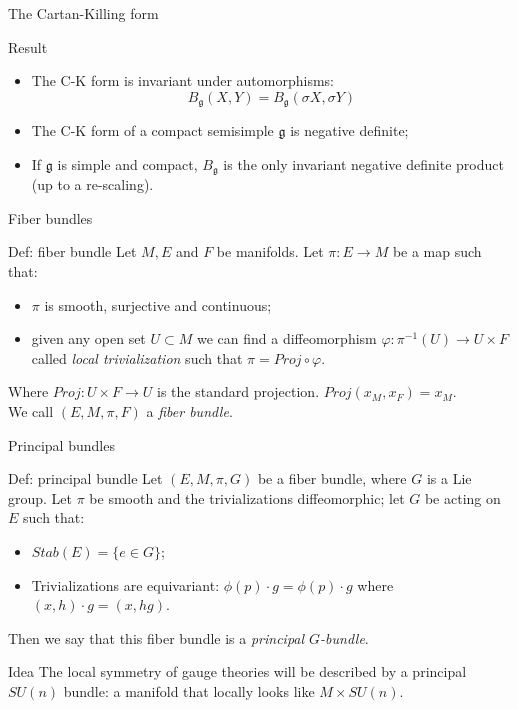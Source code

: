 \documentclass{beamer}
\begin{document}
\begin{frame}{The Cartan-Killing form}
	\begin{block}{Result}
		\begin{itemize}
			\item The C-K form is invariant under automorphisms: $$B_\mathfrak{g}(X,Y)=B_\mathfrak{g}(\sigma X,\sigma Y)$$
			\item The C-K form of a compact semisimple $\mathfrak{g}$ is negative definite;
			\item If $\mathfrak{g}$ is simple and compact, $B_\mathfrak{g}$ is the only invariant negative definite product (up to a re-scaling).
			
		\end{itemize}
	\end{block}
\end{frame}
\begin{frame}{Fiber bundles}
	\begin{exampleblock}{Def: fiber bundle}
		Let $M, E$ and $F$ be manifolds. Let $\pi: E\rightarrow M$ be a map such that:
		\begin{itemize}
			\item $\pi$ is smooth, surjective and continuous;
			\item given any open set $U\subset M$ we can find a diffeomorphism $\varphi: \pi^{-1}(U)\rightarrow U\times F$ called \textit{local trivialization} such that $\pi=Proj\circ \varphi$.
		\end{itemize}
		Where $Proj: U\times F\rightarrow U$ is the standard projection. $Proj(x_M,x_F)=x_M$.\\
		We call $(E,M,\pi,F)$ a \textit{fiber bundle}.
	\end{exampleblock}
\end{frame}
\begin{frame}{Principal bundles}
	\begin{exampleblock}{Def: principal bundle}
		Let $(E,M,\pi,G)$ be a fiber bundle, where $G$ is a Lie group. Let $\pi$ be smooth and the trivializations diffeomorphic; let $G$ be acting on $E$ such that:
		\begin{itemize}
			\item $Stab(E)=\{e\in G\}$;
			\item Trivializations are equivariant: $\phi(p)\cdot g=\phi(p)\cdot g$ where $(x,h)\cdot g=(x,hg)$.
		\end{itemize} 
		Then we say that this fiber bundle is a \textit{principal $G$-bundle}.
	\end{exampleblock}
	\begin{block}{Idea}
		The local symmetry of gauge theories will be described by a principal $SU(n)$ bundle: a manifold that locally looks like $M\times SU(n)$.
	\end{block}
\end{frame}
\end{document}
